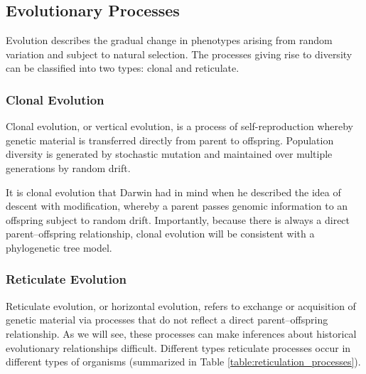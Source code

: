 \subsection{Evolutionary Processes}

Evolution describes the gradual change in phenotypes arising from random variation and subject to natural selection.
The processes giving rise to diversity can be classified into two types: clonal and reticulate.

\subsubsection{Clonal Evolution}

Clonal evolution, or vertical evolution, is a process of self-reproduction whereby genetic material is transferred directly from parent to offspring.
Population diversity is generated by stochastic mutation and maintained over multiple generations by random drift.

It is clonal evolution that Darwin had in mind when he described the idea of descent with modification, whereby a parent passes genomic information to an offspring subject to random drift.
Importantly, because there is always a direct parent--offspring relationship, clonal evolution will be consistent with a phylogenetic tree model.

\subsubsection{Reticulate Evolution}

Reticulate evolution, or horizontal evolution, refers to exchange or acquisition of genetic material via processes that do not reflect a direct parent--offspring relationship.
As we will see, these processes can make inferences about historical evolutionary relationships difficult.
Different types reticulate processes occur in different types of organisms (summarized in Table \ref{table:reticulation_processes}).

